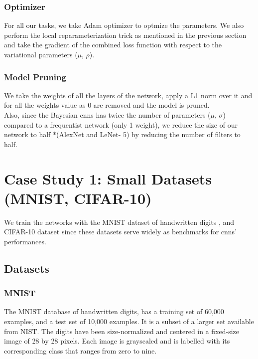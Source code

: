\subsubsection{Optimizer}

For all our tasks, we take Adam optimizer \cite{KingmaB14} to optmize the parameters. We also perform the local reparameterization trick as mentioned in the previous section and take the gradient of the combined loss function with respect to the variational parameters ($\mu$, $\rho$).

\subsubsection{Model Pruning}

We take the weights of all the layers of the network, apply a L1 norm over it and for all the weights value as 0 are removed and the model is pruned. \\ Also, since the Bayesian \acp{cnn} has twice the number of parameters ($\mu$, $\sigma$) compared to a frequentist network (only 1 weight), we reduce the size of our network to half *(AlexNet and LeNet- 5) by reducing the number of filters to half. 

\section{Case Study 1: Small Datasets (MNIST, CIFAR-10)}

We train the networks with the MNIST dataset of handwritten digits \cite{lecun1998gradient}, and CIFAR-10 dataset \cite{krizhevsky2009learning} since these datasets serve widely as benchmarks for \acp{cnn}' performances. 

\subsection{Datasets}
\newline
\subsubsection{MNIST}
The MNIST database \cite{lecun-mnisthandwrittendigit-2010} of handwritten digits, has a training set of 60,000 examples, and a test set of 10,000 examples. It is a subset of a larger set available from NIST. The digits have been size-normalized and centered in a fixed-size image of 28 by 28 pixels. Each image is grayscaled and is labelled with its corresponding class that ranges from zero to nine.
\newline

